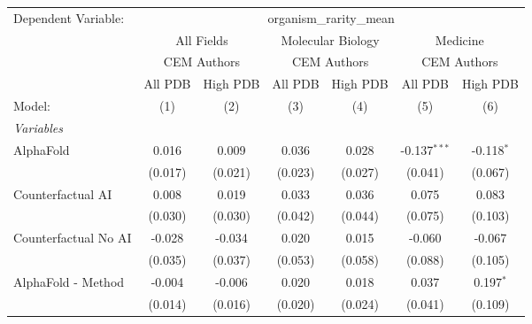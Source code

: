 \begingroup
\centering
\begin{tabular}{lcccccc}
   \tabularnewline \midrule \midrule
   Dependent Variable: & \multicolumn{6}{c}{organism\_rarity\_mean}\\
 & \multicolumn{2}{c}{All Fields} & \multicolumn{2}{c}{Molecular Biology} & \multicolumn{2}{c}{Medicine} \\
\cmidrule(lr){2-3} \cmidrule(lr){4-5} \cmidrule(lr){6-7}
 & \multicolumn{2}{c}{CEM Authors} & \multicolumn{2}{c}{CEM Authors} & \multicolumn{2}{c}{CEM Authors} \\
\cmidrule(lr){2-3} \cmidrule(lr){4-5} \cmidrule(lr){6-7}
 & \multicolumn{1}{c}{All PDB} & \multicolumn{1}{c}{High PDB} & \multicolumn{1}{c}{All PDB} & \multicolumn{1}{c}{High PDB} & \multicolumn{1}{c}{All PDB} & \multicolumn{1}{c}{High PDB} \\
\cmidrule(lr){2-2} \cmidrule(lr){3-3} \cmidrule(lr){4-4} \cmidrule(lr){5-5} \cmidrule(lr){6-6} \cmidrule(lr){7-7}
   Model:                                                     & (1)         & (2)          & (3)         & (4)          & (5)            & (6)\\  
   \midrule
   \emph{Variables}\\
   AlphaFold                                                  & 0.016       & 0.009        & 0.036       & 0.028        & -0.137$^{***}$ & -0.118$^{*}$\\   
                                                              & (0.017)     & (0.021)      & (0.023)     & (0.027)      & (0.041)        & (0.067)\\   
   Counterfactual AI                                          & 0.008       & 0.019        & 0.033       & 0.036        & 0.075          & 0.083\\   
                                                              & (0.030)     & (0.030)      & (0.042)     & (0.044)      & (0.075)        & (0.103)\\   
   Counterfactual No AI                                       & -0.028      & -0.034       & 0.020       & 0.015        & -0.060         & -0.067\\   
                                                              & (0.035)     & (0.037)      & (0.053)     & (0.058)      & (0.088)        & (0.105)\\   
   AlphaFold - Method                                         & -0.004      & -0.006       & 0.020       & 0.018        & 0.037          & 0.197$^{*}$\\   
                                                              & (0.014)     & (0.016)      & (0.020)     & (0.024)      & (0.041)        & (0.109)\\   

\end{tabular}
